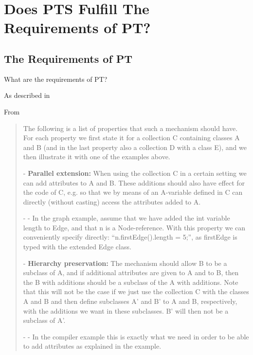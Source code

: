 \chapter{Does PTS Fulfill The Requirements of PT?}\label{ch:does-pts-fulfill-the-requirements-of-pt?}

\section{The Requirements of PT}\label{sec:the-requirements-of-pt}

What are the requirements of PT?

As described in~\cite{jot}

From~\cite{jot}

\begin{quotation}
    The  following  is  a  list  of  properties  that  such  a  mechanism  should  have.
    For  each  property  we  first  state  it  for  a  collection  C  containing  classes  A  and  B  (and  in  the  last  property  also  a  collection  D  with  a  class  E),  and  we  then  illustrate  it  with  one  of  the  examples above.

    - \textbf{Parallel  extension:}  When  using  the  collection  C  in  a  certain  setting  we  can  add  attributes  to  A  and  B.
    These  additions  should  also  have  effect  for  the  code  of  C,  e.g.  so  that  we  by  means  of  an  A-variable  defined  in  C  can  directly  (without  casting) access the attributes added to A.

    - - In the graph example, assume that we have added the int variable length to Edge, and  that  n  is  a  Node-reference.
    With  this  property  we  can  conveniently  specify  directly: “n.firstEdge().length = 5;”, as firstEdge is typed with the extended Edge class.

    - \textbf{Hierarchy  preservation:}  The  mechanism  should  allow  B  to  be  a  subclass  of  A,  and  if  additional  attributes  are  given  to  A  and  to  B,  then  the  B  with  additions  should be a subclass of the A with additions.
    Note that this will not be the case if we just use the collection C with the classes A and B and then define subclasses A’  and  B’  to  A  and  B,  respectively,  with  the  additions  we  want  in  these  subclasses.
    B’ will then not be a subclass of A’.

    - - In  the  compiler  example  this  is  exactly  what we need in order to be able to add attributes as explained in the example.


\end{quotation}
